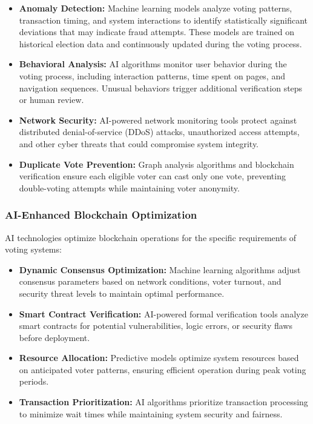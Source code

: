 \documentclass[conference]{IEEEtran}
\begin{document}
\begin{itemize}
    \item \textbf{Anomaly Detection:} Machine learning models analyze voting patterns, transaction timing, and system interactions to identify statistically significant deviations that may indicate fraud attempts. These models are trained on historical election data and continuously updated during the voting process.
    
    \item \textbf{Behavioral Analysis:} AI algorithms monitor user behavior during the voting process, including interaction patterns, time spent on pages, and navigation sequences. Unusual behaviors trigger additional verification steps or human review.
    
    \item \textbf{Network Security:} AI-powered network monitoring tools protect against distributed denial-of-service (DDoS) attacks, unauthorized access attempts, and other cyber threats that could compromise system integrity.
    
    \item \textbf{Duplicate Vote Prevention:} Graph analysis algorithms and blockchain verification ensure each eligible voter can cast only one vote, preventing double-voting attempts while maintaining voter anonymity.
\end{itemize}

\subsubsection{AI-Enhanced Blockchain Optimization}
AI technologies optimize blockchain operations for the specific requirements of voting systems:

\begin{itemize}
    \item \textbf{Dynamic Consensus Optimization:} Machine learning algorithms adjust consensus parameters based on network conditions, voter turnout, and security threat levels to maintain optimal performance.
    
    \item \textbf{Smart Contract Verification:} AI-powered formal verification tools analyze smart contracts for potential vulnerabilities, logic errors, or security flaws before deployment.
    
    \item \textbf{Resource Allocation:} Predictive models optimize system resources based on anticipated voter patterns, ensuring efficient operation during peak voting periods.
    
    \item \textbf{Transaction Prioritization:} AI algorithms prioritize transaction processing to minimize wait times while maintaining system security and fairness.
\end{itemize}
\end{document}
